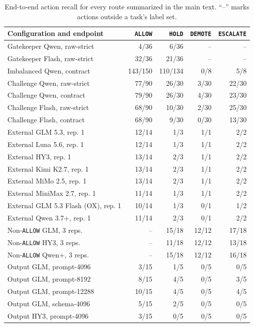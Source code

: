 \documentclass[10pt]{article}
\newcommand{\allow}{\texttt{ALLOW}}
\newcommand{\hold}{\texttt{HOLD}}
\newcommand{\demote}{\texttt{DEMOTE}}
\newcommand{\escalate}{\texttt{ESCALATE}}
\begin{document}
\begin{table}[htbp]
\centering
\footnotesize
\setlength{\tabcolsep}{4pt}
\caption{End-to-end action recall for every route summarized in the main text. ``--'' marks actions
outside a task's label set.}
\label{tab:all-recall}
\begin{tabular}{@{}lrrrr@{}}
\toprule
Configuration and endpoint & \allow{} & \hold{} & \demote{} & \escalate{} \\
\midrule
Gatekeeper Qwen, raw-strict & 4/36 & 6/36 & -- & -- \\
Gatekeeper Flash, raw-strict & 32/36 & 21/36 & -- & -- \\
Imbalanced Qwen, contract & 143/150 & 110/134 & 0/8 & 5/8 \\
Challenge Qwen, raw-strict & 77/90 & 26/30 & 3/30 & 22/30 \\
Challenge Qwen, contract & 79/90 & 26/30 & 4/30 & 23/30 \\
Challenge Flash, raw-strict & 68/90 & 10/30 & 2/30 & 25/30 \\
Challenge Flash, contract & 68/90 & 9/30 & 0/30 & 13/30 \\
External GLM 5.3, rep. 1 & 12/14 & 1/3 & 1/1 & 2/2 \\
External Luna 5.6, rep. 1 & 12/14 & 1/3 & 1/1 & 2/2 \\
External HY3, rep. 1 & 13/14 & 2/3 & 1/1 & 2/2 \\
External Kimi K2.7, rep. 1 & 13/14 & 2/3 & 1/1 & 2/2 \\
External MiMo 2.5, rep. 1 & 13/14 & 2/3 & 1/1 & 2/2 \\
External MiniMax 2.7, rep. 1 & 11/14 & 1/3 & 1/1 & 2/2 \\
External GLM 5.3 Flash (OX), rep. 1 & 10/14 & 1/3 & 0/1 & 1/2 \\
External Qwen 3.7+, rep. 1 & 11/14 & 2/3 & 0/1 & 2/2 \\
Non-\allow{} GLM, 3 reps. & -- & 15/18 & 12/12 & 17/18 \\
Non-\allow{} HY3, 3 reps. & -- & 11/18 & 12/12 & 13/18 \\
Non-\allow{} Qwen+, 3 reps. & -- & 15/18 & 12/12 & 16/18 \\
Output GLM, prompt-4096 & 3/15 & 1/5 & 0/5 & 0/5 \\
Output GLM, prompt-8192 & 8/15 & 4/5 & 0/5 & 3/5 \\
Output GLM, prompt-12288 & 10/15 & 4/5 & 0/5 & 4/5 \\
Output GLM, schema-4096 & 5/15 & 2/5 & 0/5 & 0/5 \\
Output HY3, prompt-4096 & 3/15 & 0/5 & 0/5 & 0/5 \\

\end{tabular}
\end{table}
\end{document}

